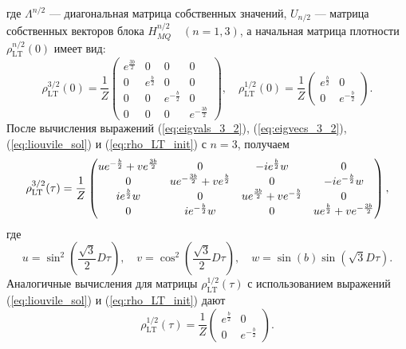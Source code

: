 %
где $\Lambda^{n/2}$ --- диагональная матрица собственных значений,
$U_{n/2}$ --- матрица собственных векторов блока $H_{MQ}^{n/2} \quad (n=1, 3)$,
а начальная матрица плотности $\rho_\mathrm{LT}^{n/2}(0)$ имеет вид:
%
\begin{equation}\label{eq:rho_LT_init}
  \rho_\mathrm{LT}^{3/2}(0) = \dfrac 1 Z
  \begin{pmatrix}
      e^{\frac{3b}{2}} & 0 & 0 & 0
      \\
      0 & e^{\frac{b}{2}} & 0 & 0
      \\
      0 & 0 & e^{-\frac{b}{2}} & 0
      \\
      0 & 0 & 0 & e^{-\frac{3b}{2}}
  \end{pmatrix},
  \quad
  \rho_\mathrm{LT}^{1/2}(0) = \dfrac 1 Z
  \begin{pmatrix}
      e^{\frac{b}{2}} & 0
      \\
      0 & e^{-\frac{b}{2}}
  \end{pmatrix}.
\end{equation}
После вычисления выражений
(\ref{eq:eigvals_3_2}),
(\ref{eq:eigvecs_3_2}),
(\ref{eq:liouvile_sol})
и (\ref{eq:rho_LT_init}) с $n = 3$,
получаем
%
\begin{equation}\label{eq:rho_LT_eval_3_2}
  \rho_\mathrm{LT}^{3/2}(\tau) = \frac{1}{Z} \\
  \begin{pmatrix}
      ue^{-\frac{b}{2}} + ve^{\frac{3b}{2}}
    &
      0
    &
      -ie^{\frac{b}{2}}w
    &
      0
    \\
      0
    &
      ue^{-\frac{3b}{2}} + ve^{\frac{b}{2}}
    &
      0
    &
      -ie^{-\frac{b}{2}}w
    \\
      ie^{\frac{b}{2}}w
    &
      0
    &
      ue^{\frac{3b}{2}} + ve^{-\frac{b}{2}}
    &
      0
    \\
      0
    &
      ie^{-\frac{b}{2}}w
    &
      0
    &
      ue^{\frac{b}{2}} + ve^{-\frac{3b}{2}}
  \end{pmatrix},
\end{equation}
где
\begin{equation}
    u = \sin^2\left(\frac{\sqrt{3}}{2}D\tau\right),
    \quad
    v = \cos^2\left(\frac{\sqrt{3}}{2}D\tau\right),
    \quad
    w = \sin(b)\sin\left(\sqrt{3}D\tau\right).
\end{equation}
%
Аналогичные вычисления для матрицы $\rho^{1/2}_\mathrm{LT} (\tau)$
с использованием выражений (\ref{eq:liouvile_sol}) и (\ref{eq:rho_LT_init})
дают
%
\begin{equation}
\label{eq:rho_LT_eval_1_2}
    \rho_\mathrm{LT}^{1/2}(\tau) = \frac 1 Z
    \begin{pmatrix}
            e^{\frac b 2}
        &
            0
        \\
            0
        &
            e^{-\frac b 2}
    \end{pmatrix}.
\end{equation}

